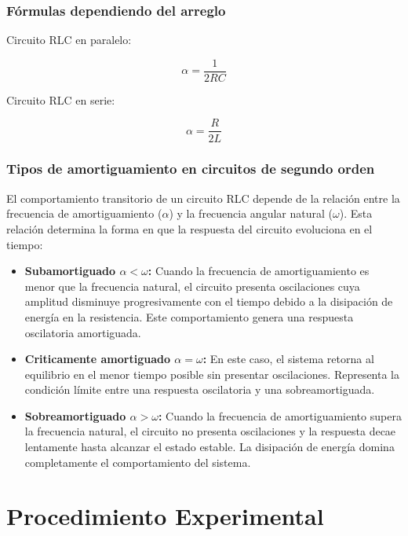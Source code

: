 \documentclass{article}
\begin{document}
    \subsubsection{Fórmulas dependiendo del arreglo}

    Circuito RLC en paralelo:

    \[
        \alpha = \frac{1}{2RC}
    \]

    Circuito RLC en serie:

    \[
        \alpha = \frac{R}{2L}
    \]

    \subsubsection{Tipos de amortiguamiento en circuitos de segundo orden}

    El comportamiento transitorio de un circuito RLC depende de la relación entre la frecuencia de amortiguamiento ($\alpha$) y la frecuencia angular natural ($\omega$). Esta relación determina la forma en que la respuesta del circuito evoluciona en el tiempo:

    \begin{itemize}
        \item \textbf{Subamortiguado $\alpha < \omega$:} Cuando la frecuencia de amortiguamiento es menor que la frecuencia natural, el circuito presenta oscilaciones cuya amplitud disminuye progresivamente con el tiempo debido a la disipación de energía en la resistencia. Este comportamiento genera una respuesta oscilatoria amortiguada.
        \item \textbf{Criticamente amortiguado $\alpha = \omega$:} En este caso, el sistema retorna al equilibrio en el menor tiempo posible sin presentar oscilaciones. Representa la condición límite entre una respuesta oscilatoria y una sobreamortiguada.
        \item \textbf{Sobreamortiguado $\alpha > \omega$:} Cuando la frecuencia de amortiguamiento supera la frecuencia natural, el circuito no presenta oscilaciones y la respuesta decae lentamente hasta alcanzar el estado estable. La disipación de energía domina completamente el comportamiento del sistema.
    \end{itemize}

    \section{Procedimiento Experimental}
\end{document}
